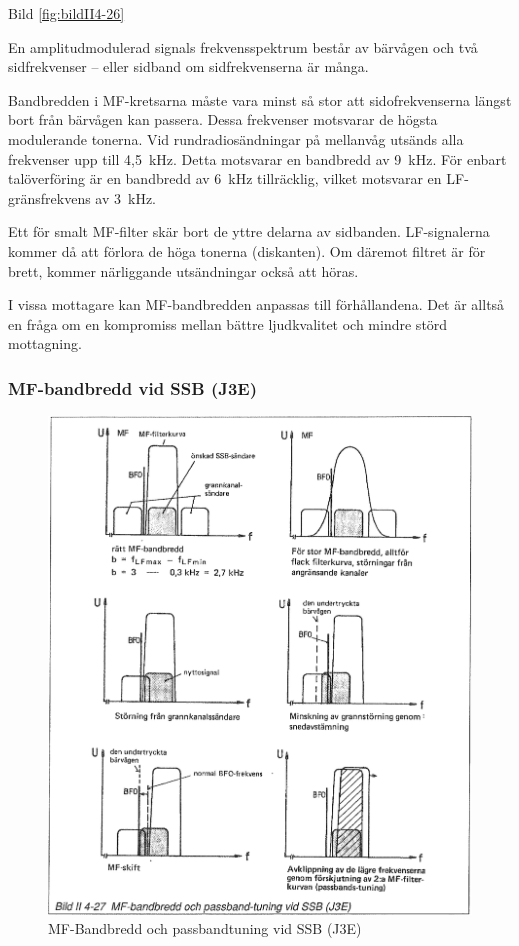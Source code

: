Bild \ref{fig:bildII4-26}

En amplitudmodulerad signals frekvensspektrum består av bärvågen och
två sidfrekvenser -- eller sidband om sidfrekvenserna är många.

Bandbredden i MF-kretsarna måste vara minst så stor att
sidofrekvenserna längst bort från bärvågen kan passera. Dessa
frekvenser motsvarar de högsta modulerande tonerna.
Vid rundradiosändningar på mellanvåg utsänds alla frekvenser upp till 4,5~kHz.
Detta motsvarar en bandbredd av 9~kHz. För enbart talöverföring
är en bandbredd av 6~kHz tillräcklig, vilket motsvarar en
LF-gränsfrekvens av 3~kHz.

Ett för smalt MF-filter skär bort de yttre delarna av
sidbanden. LF-signalerna kommer då att förlora de höga tonerna
(diskanten). Om däremot filtret är för brett, kommer närliggande
utsändningar också att höras.

I vissa mottagare kan MF-bandbredden anpassas till förhållandena. Det
är alltså en fråga om en kompromiss mellan bättre ljudkvalitet och
mindre störd mottagning.

\subsubsection{MF-bandbredd vid SSB (J3E)}

\begin{figure}
  \includegraphics[width=\textwidth]{images/bild_2_4-27}
  \caption{MF-Bandbredd och passbandtuning vid SSB (J3E)}
  \label{fig:bildII4-27}
\end{figure}

